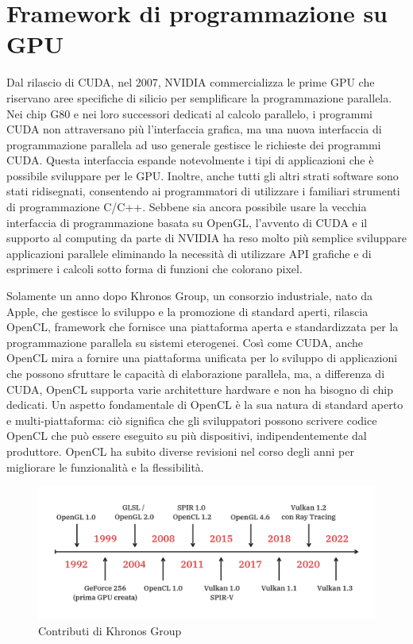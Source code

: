 \section[Framework di programmazione su GPU]{Framework di programmazione su GPU}

Dal rilascio di \gls{CUDA}, nel 2007, NVIDIA commercializza le prime \gls{GPU} che riservano aree specifiche di silicio per semplificare la programmazione parallela. Nei chip G80 e nei loro successori dedicati al calcolo parallelo, i programmi \gls{CUDA} non attraversano più l'interfaccia grafica, ma una nuova interfaccia di programmazione parallela ad uso generale gestisce le richieste dei programmi \gls{CUDA}. Questa interfaccia espande notevolmente i tipi di applicazioni che è possibile sviluppare per le \gls{GPU}. Inoltre, anche tutti gli altri strati software sono stati ridisegnati, consentendo ai programmatori di utilizzare i familiari strumenti di programmazione C/C++. Sebbene sia ancora possibile usare la vecchia interfaccia di programmazione basata su OpenGL, l'avvento di \gls{CUDA} e il supporto al computing da parte di NVIDIA ha reso molto più semplice sviluppare applicazioni parallele eliminando la necessità di utilizzare \gls{API} grafiche e di esprimere i calcoli sotto forma di funzioni che colorano pixel.

Solamente un anno dopo Khronos Group, un consorzio industriale, nato da Apple, che gestisce lo sviluppo e la promozione di standard aperti, rilascia OpenCL, framework che fornisce una piattaforma aperta e standardizzata per la programmazione parallela su sistemi eterogenei. Così come \gls{CUDA}, anche OpenCL mira a fornire una piattaforma unificata per lo sviluppo di applicazioni che possono sfruttare le capacità di elaborazione parallela, ma, a differenza di \gls{CUDA}, OpenCL supporta varie architetture hardware e non ha bisogno di chip dedicati. Un aspetto fondamentale di OpenCL è la sua natura di standard aperto e multi-piattaforma: ciò significa che gli sviluppatori possono scrivere codice OpenCL che può essere eseguito su più dispositivi, indipendentemente dal produttore. OpenCL ha subito diverse revisioni nel corso degli anni per migliorare le funzionalità e la flessibilità.

\begin{figure}[ht]
    \centering
    \includegraphics[width=1\linewidth]{images/chapter2/vulkan_history.png}
    \caption{Contributi di Khronos Group}
    \label{fig:vulkan_history}
\end{figure}

